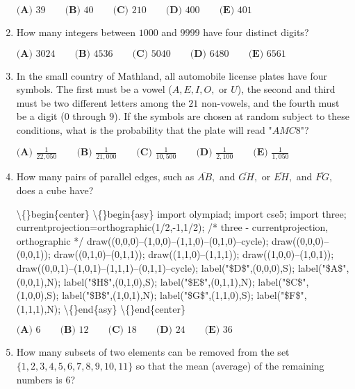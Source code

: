 \documentclass{article}
\begin{document}
\begin{enumerate}[label=\arabic*., itemsep=0.5em]
\(\textbf{(A) }39\qquad\textbf{(B) }40\qquad\textbf{(C) }210\qquad\textbf{(D) }400\qquad \textbf{(E) }401\)\par \vspace{0.5em}\item How many integers between \(1000\) and \(9999\) have four distinct digits?

\(\textbf{(A) }3024\qquad\textbf{(B) }4536\qquad\textbf{(C) }5040\qquad\textbf{(D) }6480\qquad \textbf{(E) }6561\)\par \vspace{0.5em}\item In the small country of Mathland, all automobile license plates have four symbols. The first must be a vowel (\(A, E, I, O,\) or \(U\)), the second and third must be two different letters among the \(21\) non-vowels, and the fourth must be a digit (\(0\) through \(9\)). If the symbols are chosen at random subject to these conditions, what is the probability that the plate will read "\(AMC8\)"?

\(\textbf{(A) } \frac{1}{22,050} \qquad \textbf{(B) } \frac{1}{21,000}\qquad \textbf{(C) } \frac{1}{10,500}\qquad \textbf{(D) } \frac{1}{2,100} \qquad \textbf{(E) } \frac{1}{1,050}\)\par \vspace{0.5em}\item How many pairs of parallel edges, such as \(\overline{AB},\) and \(\overline{GH},\) or \(\overline{EH},\) and \(\overline{FG},\) does a cube have?


\textbackslash\{\}begin\{center\}
\textbackslash\{\}begin\{asy\}
import olympiad;
import cse5;
import three; currentprojection=orthographic(1/2,-1,1/2); /* three - currentprojection, orthographic */ draw((0,0,0)--(1,0,0)--(1,1,0)--(0,1,0)--cycle); draw((0,0,0)--(0,0,1)); draw((0,1,0)--(0,1,1)); draw((1,1,0)--(1,1,1)); draw((1,0,0)--(1,0,1));  draw((0,0,1)--(1,0,1)--(1,1,1)--(0,1,1)--cycle); label("\$D\$",(0,0,0),S); label("\$A\$",(0,0,1),N); label("\$H\$",(0,1,0),S); label("\$E\$",(0,1,1),N); label("\$C\$",(1,0,0),S); label("\$B\$",(1,0,1),N); label("\$G\$",(1,1,0),S); label("\$F\$",(1,1,1),N);
\textbackslash\{\}end\{asy\}
\textbackslash\{\}end\{center\}


\(\textbf{(A) }6 \qquad\textbf{(B) }12 \qquad\textbf{(C) } 18 \qquad\textbf{(D) } 24 \qquad \textbf{(E) } 36\)\par \vspace{0.5em}\item How many subsets of two elements can be removed from the set \(\{1, 2, 3, 4, 5, 6, 7, 8, 9, 10, 11\}\) so that the mean (average) of the remaining numbers is \(6\)?


\end{enumerate}
\end{document}
